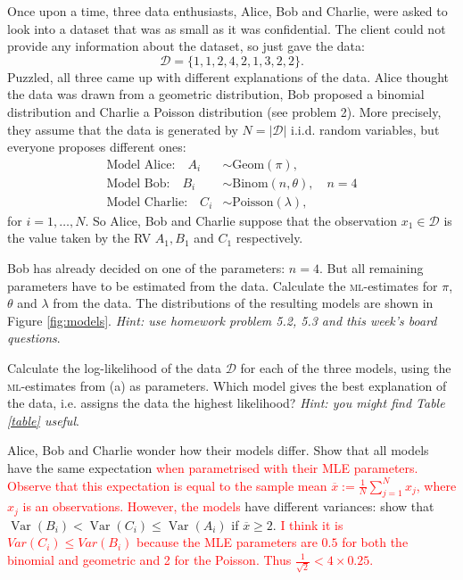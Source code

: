\documentclass[a4paper,10pt,landscape,twocolumn]{scrartcl}
\DeclareMathOperator{\Var}{Var}
\newcommand{\philip}[1]{\textcolor{red}{#1}}
\begin{document}
\begin{exercise}
Once upon a time, three data enthusiasts, Alice, Bob and Charlie, were asked to look into a dataset that was as small as it was confidential. The client could not provide any information about the dataset, so just gave the data:
	\[
		\mathcal{D} = \{ 1, 1, 2, 4, 2, 1, 3, 2, 2 \}.
	\]
	Puzzled, all three came up with different explanations of the data. Alice thought the data was drawn from a geometric distribution, Bob proposed a binomial distribution and Charlie a Poisson distribution (see problem 2). More precisely, they assume that the data is generated by $N = |\mathcal D|$ i.i.d. random variables, but everyone proposes different ones:
	\begin{align}
		\text{Model Alice:} \quad A_i &\sim \text{Geom}(\pi),\\
		\text{Model Bob:} \quad B_i &\sim \text{Binom}(n, \theta), \quad n=4\\
		\text{Model Charlie:} \quad C_i &\sim \text{Poisson}(\lambda),
	\end{align}
	for $i = 1, \dots, N$. So Alice, Bob and Charlie suppose that the observation $x_1 \in \mathcal D$ is the value taken by the RV $A_1, B_1$ and $C_1$ respectively.
	
	\begin{subex}[0.5pt]
	Bob has already decided on one of the parameters: $n=4$. But all remaining parameters have to be estimated from the data. Calculate the \textsc{ml}-estimates for $\pi$, $\theta$ and $\lambda$ from the data. The distributions of the resulting models are shown in Figure \ref{fig:models}. 
	\emph{Hint: use homework problem 5.2, 5.3 and this week's board questions}.
	\end{subex}
	
	\begin{subex}[0.5pt]
		Calculate the log-likelihood of the data $\mathcal D$ for each of the three models, using the \textsc{ml}-estimates from (a) as parameters. Which model gives the best explanation of the data, i.e. assigns the data the highest likelihood? \emph{Hint: you might find Table \ref{table} useful}.
	\end{subex}
	
	\begin{subex}[1pt]
		Alice, Bob and Charlie wonder how their models differ. Show that all models have the same expectation \philip{when parametrised with their MLE parameters.} \philip{Observe that this expectation is equal to the sample mean $\overline x := \frac{1}{N} \sum_{j=1}^N x_j$, where $x_j$ is an observations. However, the models} have different variances: show that $\Var(B_i) < \Var(C_i) \le \Var(A_i)$ if $\overline x \ge 2$. \philip{I think it is $ Var(C_{i}) \leq Var(B_{i}) $ because
		the MLE parameters are $ 0.5 $ for both the binomial and geometric and 2 for the Poisson. Thus $ \frac{1}{\sqrt{2}} < 4\times 0.25 $.}
	\end{subex}
	

\end{exercise}
\end{document}
